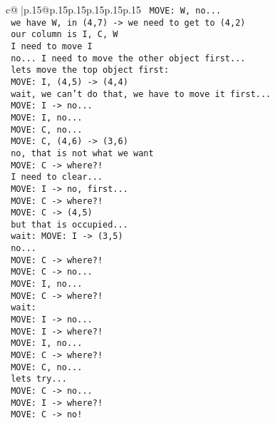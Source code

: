 \documentclass{article}
\begin{document}
{\begin{supertabular}{c@{$\;$}|p{.15\linewidth}@{}p{.15\linewidth}p{.15\linewidth}p{.15\linewidth}p{.15\linewidth}p{.15\linewidth}}
{{{\texttt{ MOVE: W, no...} \\
\texttt{ we have W, in (4,7) {-}> we need to get to (4,2) } \\
\texttt{ our column is I, C, W } \\
\texttt{ I need to move I } \\
\texttt{ no... I need to move the other object first...} \\
\texttt{ lets move the top object first: } \\
\texttt{ MOVE: I, (4,5) {-}> (4,4) } \\
\texttt{ wait, we can't do that, we have to move it first...} \\
\texttt{ MOVE: I {-}> no...} \\
\texttt{ MOVE: I, no...} \\
\texttt{ MOVE: C, no... } \\
\texttt{ MOVE: C, (4,6) {-}> (3,6) } \\
\texttt{ no, that is not what we want} \\
\texttt{ MOVE: C {-}> where?!} \\
\texttt{ I need to clear...} \\
\texttt{ MOVE: I {-}> no, first...} \\
\texttt{ MOVE: C {-}> where?!} \\
\texttt{ MOVE: C {-}> (4,5) } \\
\texttt{ but that is occupied...} \\
\texttt{ wait: MOVE: I {-}> (3,5) } \\
\texttt{ no... } \\
\texttt{ MOVE: C {-}> where?!} \\
\texttt{ MOVE: C {-}> no...} \\
\texttt{ MOVE: I, no...} \\
\texttt{ MOVE: C {-}> where?!} \\
\texttt{ wait: } \\
\texttt{ MOVE: I {-}> no...} \\
\texttt{ MOVE: I {-}> where?!} \\
\texttt{ MOVE: I, no...} \\
\texttt{ MOVE: C {-}> where?!} \\
\texttt{ MOVE: C, no...} \\
\texttt{ lets try...} \\
\texttt{ MOVE: C {-}> no...} \\
\texttt{ MOVE: I {-}> where?!} \\
\texttt{ MOVE: C {-}> no!} \\
}}}
\end{supertabular}}
\end{document}
